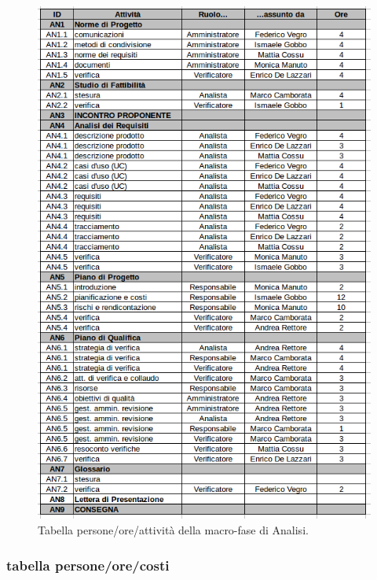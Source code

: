 \begin{figure}[h]
\begin{center}
\includegraphics[scale=0.50]{img/analisi-attivita.png}
\caption{Tabella persone/ore/attività della macro-fase di Analisi.}
\end{center}
\end{figure}
\clearpage

\subsubsection{tabella persone/ore/costi}

